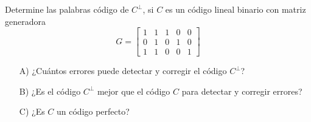 
Determine las palabras código de $C^\perp$, si $C$ es un código lineal binario con matriz generadora
\begin{equation*}
    G = \begin{bmatrix} 1 & 1 & 1 & 0 & 0 \\ 0 & 1 & 0 & 1 & 0 \\ 1 & 1 & 0 & 0 & 1 \end{bmatrix}
\end{equation*}

\begin{itemize}
    \item[A)] ¿Cuántos errores puede detectar y corregir el código $C^\perp$?
    \item[B)] ¿Es el código $C^\perp$ mejor que el código $C$ para detectar y corregir errores?
    \item[C)]¿Es $C$ un código perfecto?
\end{itemize}
